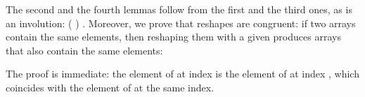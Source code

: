 The second and the fourth lemmas follow from the first and the third ones, as
 is an involution:  ( )  .
Moreover, we prove that reshapes are congruent: if two arrays contain the same
elements, then reshaping them with a given  produces arrays that also
contain the same elements:
\begin{code}%
%
\>[2]%
\>[17]\AgdaSymbol{:}\AgdaSpace{}%
\AgdaSymbol{\{}\AgdaSpace{}%
\AgdaSpace{}%
\AgdaSymbol{:}\AgdaSpace{}%
\AgdaSpace{}%
\AgdaSpace{}%
\AgdaSymbol{\}}\AgdaSpace{}%
\AgdaSymbol{(}\AgdaSpace{}%
\AgdaSymbol{:}\AgdaSpace{}%
\AgdaSpace{}%
\AgdaSpace{}%
\AgdaSymbol{)}\AgdaSpace{}%
\AgdaSpace{}%
\AgdaSpace{}%
\AgdaSpace{}%
\AgdaSpace{}%
\AgdaSpace{}%
\AgdaSpace{}%
\AgdaSpace{}%
\AgdaSpace{}%
\AgdaSpace{}%
\AgdaSpace{}%
\AgdaSpace{}%
\<%
\end{code}
The proof is immediate: the element of \;\; at
index  is the element of  at index \;\;\;,
which coincides with the element of  at the same index.

